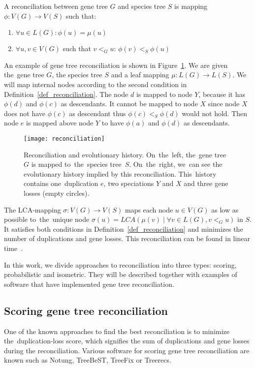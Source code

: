 \begin{definition}
A reconciliation between gene tree $G$ and species tree $S$ is mapping $\phi: V(G) \rightarrow V(S)$ such that:
	\begin{enumerate}\itemsep0em
	\item $\forall u \in L(G): \phi(u) = \mu(u)$
	\item $\forall u, v \in V(G)$ such that $v<_Gu$: $\phi(v)<_S\phi(u)$
	\end{enumerate}
	\label{def_reconciliation}
\end{definition}

An example of gene tree reconciliation is shown in Figure~\ref{reconciliation}. We are given the~gene tree $G$, the species tree $S$ and a leaf mapping $\mu: L(G) \rightarrow L(S)$. We will map internal nodes according to the second condition in Definition~\ref{def_reconciliation}. The node $d$ is mapped to node $Y$, because it has $\phi(d)$ and $\phi(c)$ as descendants. It cannot be mapped to node $X$ since node $X$ does not have $\phi(c)$ as descendant thus $\phi(c)<_S\phi(d)$ would not hold. Then node $e$ is mapped above node $Y$ to have $\phi(a)$ and $\phi(d)$ as descendants.

\begin{figure}[ht!]
	\centering
	\label{reconciliation}
  	\texttt{[image: reconciliation]}
  	\caption[Reconciliation and evolutionary history]{Reconciliation and evolutionary history. On~the~left, the~gene tree~$G$ is mapped to~the~species tree~$S$. On~the~right, we~can see the evolutionary history implied by this reconciliation. This~history contains one~duplication $e$, two speciations $Y$ and $X$ and three gene losses (empty circles).}
\end{figure}

The LCA-mapping $\sigma: V(G) \rightarrow V(S)$ maps each node $u \in V(G)$ as low as possible to~the~unique node $\sigma(u) = LCA(\mu(v) \mid \forall v \in L(G), v<_Gu)$ in $S$. It satisfies both conditions in Definition~\ref{def_reconciliation} and minimizes the number of duplications and gene losses. This reconciliation can be found in linear time~\cite{hasic}.

In this work, we divide approaches to reconciliation into three types: scoring, probabilistic and isometric. They will be described together with examples of software that have implemented gene tree reconciliation. 

\subsection{Scoring gene tree reconciliation}
One of the known approaches to find the best reconciliation is to minimize the~duplication-loss score, which signifies the sum of duplications and gene losses during the reconciliation. Various software for scoring gene tree reconciliation are known such as Notung, TreeBeST, TreeFix or Treerecs.

